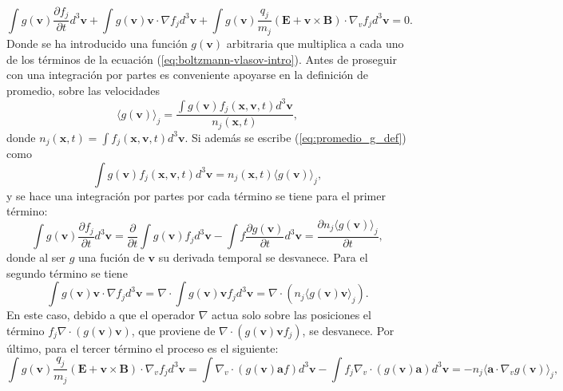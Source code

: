 \documentclass[../tesis_main_file.tex]{subfiles}
\begin{document}
\begin{equation}
    \label{eq:Boltzmann-g}
     \int g(\textbf{v})\frac{\partial f_j}{\partial t}d^3 \textbf{v}+ \int g(\textbf{v})\textbf{v}\cdot \nabla f_j d^3 \textbf{v} + \int g(\textbf{v})\frac{q_j}{m_j}\left( \textbf{E} + \textbf{v} \times \textbf{B}\right)\cdot \nabla _v f_j d^3 \textbf{v}=0.
\end{equation}
Donde se ha introducido una función $g(\textbf{v})$ arbitraria que multiplica a cada uno de los términos de la ecuación (\ref{eq:boltzmann-vlasov-intro}). Antes de proseguir con una integración por partes es conveniente apoyarse en la definición de promedio, sobre las velocidades
\begin{equation}
    \label{eq:promedio_g_def}
    \langle g(\textbf{v}) \rangle _j = \frac{\int g(\textbf{v})f_j(\textbf{x},\textbf{v},t)d^3\textbf{v}}{n_j(\textbf{x},t)},
\end{equation}
donde $n_j(\textbf{x},t)=\int f_j(\textbf{x},\textbf{v},t) d^3\textbf{v}$.
Si además se escribe (\ref{eq:promedio_g_def}) como
\begin{equation}
    \label{eq:promedio_def_2}
    \int g(\textbf{v})f_j(\textbf{x},\textbf{v},t)d^3\textbf{v}= n_j(\textbf{x},t)\langle g(\textbf{v}) \rangle _j,
    \end{equation}
y se hace una integración por partes por cada término se tiene para el primer término:
\begin{equation}
    \int g(\textbf{v})\frac{\partial f_j}{\partial t}d^3 \textbf{v}=\frac{\partial}{\partial t}\int g(\textbf{v})f_jd^3\textbf{v}-\int f\frac{\partial g(\textbf{v})}{\partial t}d^3\textbf{v}=\frac{\partial n_j \langle g(\textbf{v})\rangle_j}{\partial t},
\end{equation}
donde al ser $g$ una fución de $\textbf{v}$ su derivada temporal se desvanece.
Para el segundo término se tiene
\begin{equation}
    \int g(\textbf{v})\textbf{v}\cdot \nabla f_j d^3 \textbf{v}= \nabla \cdot \int g(\textbf{v})\textbf{v}f_j d^3\textbf{v}=\nabla \cdot \left(n_j \langle g(\textbf{v})\textbf{v} \rangle_j \right).
\end{equation}
En este caso, debido a que el operador $\nabla$ actua solo sobre las posiciones el término $f_j \nabla \cdot (g(\textbf{v})\textbf{v})$, que proviene de $\nabla \cdot (g(\textbf{v})\textbf{v}f_j)$, se desvanece.
Por último, para el tercer término el proceso es el siguiente:
    \begin{equation}
    \label{eq:3er_term_momento-g}
    \int g(\textbf{v})\frac{q_j}{m_j}\left( \textbf{E} + \textbf{v} \times \textbf{B}\right)\cdot \nabla _v f_j d^3 \textbf{v}= \int \nabla_v\cdot (g(\textbf{v})\textbf{a}f)d^3\textbf{v}- \int f_j \nabla_v\cdot (g(\textbf{v})\textbf{a})d^3\textbf{v}=-n_j\langle \textbf{a}\cdot \nabla_v g(\textbf{v})\rangle_j,
    \end{equation}
\end{document}
